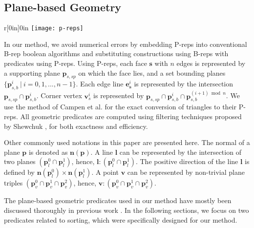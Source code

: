 \subsection{Plane-based Geometry}

\label{sec:substrates}


\begin{wrapfigure}{r}[0in]{0in}
\texttt{[image: p-reps]}
\end{wrapfigure}

In our method, we avoid numerical errors by embedding P-reps into conventional B-rep boolean algorithms and substituting constructions using B-reps with predicates using P-reps. Using P-reps, each face $\bm{s}$ with $n$ edges is represented by a supporting plane $\bm{p}_{s,sp}$ on which the face lies, and a set bounding planes $\{\bm{p}_{s,b}^i \ \vert\  i = 0, 1,...,n-1\}$. Each edge line $\bm{e}_{\bm{s}}^i$ is represented by the intersection $\bm{p}_{s,sp} \cap \bm{p}_{s,b}^i$. Corner vertex $\bm{v}_s^i$ is represented by $\bm{p}_{s,sp} \cap \bm{p}_{s,b}^i \cap \bm{p}_{s,b}^{{(i+1)}\bmod{n}}$. We use the method of Campen et al. \cite{campen2010exact} for the exact conversion of triangles to their P-reps. All geometric predicates are computed using filtering techniques proposed by Shewchuk \cite{shewchuk1997adaptive}, for both exactness and efficiency.


Other commonly used notations in this paper are presented here. The normal of a plane $\bm{p}$ is denoted as $\bm{n}(\bm{p})$. A line $\bm{l}$ can be represented by the intersection of two planes $(\bm{p}_l^0 \cap \bm{p}_l^1)$, hence, $\bm{l}\colon(\bm{p}_l^0 \cap \bm{p}_l^1)$. The positive direction of the line $\bm{l}$ is defined by $\bm{n}(\bm{p}_l^0) \times \bm{n}(\bm{p}_l^1)$. A point $\bm{v}$ can be represented by non-trivial plane triples $(\bm{p}_v^0 \cap \bm{p}_v^1 \cap \bm{p}_v^2)$, hence, $\bm{v}\colon(\bm{p}_v^0 \cap \bm{p}_v^1 \cap \bm{p}_v^2)$.




The plane-based geometric predicates used in our method have mostly been discussed thoroughly in previous work \cite{bernstein2009fast,banerjee1996topologically}. In the following sections, we focus on two predicates related to sorting, which were specifically designed for our method.

